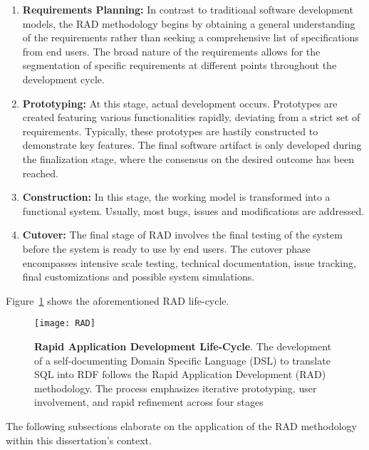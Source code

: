 \begin{enumerate}
\item \textbf{Requirements Planning:} In contrast to traditional software development models, the RAD methodology begins by obtaining a general understanding of the requirements rather than seeking a comprehensive list of specifications from end users.  The broad nature of the requirements allows for the segmentation of specific requirements at different points throughout the development cycle.

\item \textbf{Prototyping:} At this stage, actual development occurs.  Prototypes are created featuring various functionalities rapidly, deviating from a strict set of requirements.  Typically, these prototypes are hastily constructed to demonstrate key features.  The final software artifact is only developed during the finalization stage, where the consensus on the desired outcome has been reached.

\item \textbf{Construction:}  In this stage, the working model is transformed into a functional system.  Usually, most bugs, issues and modifications are addressed.

\item \textbf{Cutover:} The final stage of RAD involves the final testing of the system before the system is ready to use by end users.  The cutover phase encompasses intensive scale testing, technical documentation, issue tracking, final customizations and possible system simulations.
\end{enumerate}

Figure~\ref{fig:rad-lifecycle} shows the aforementioned RAD life-cycle.

\begin{figure}[H]
  \centering
  \texttt{[image: RAD]}
  \caption[Rapid Application Development Life-Cycle]{\textbf{Rapid Application Development Life-Cycle}.  The development of a self-documenting Domain Specific Language (DSL) to translate SQL into RDF follows the Rapid Application Development (RAD) methodology.  The process emphasizes iterative prototyping, user involvement, and rapid refinement across four stages}
  \label{fig:rad-lifecycle}
\end{figure}

The following subsections elaborate on the application of the RAD methodology within this dissertation's context.

